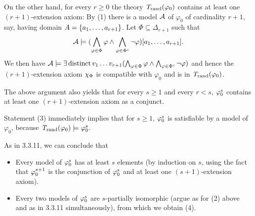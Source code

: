 \begin{enumerate}[1.]
On the other hand, for every $r \geq 0$ the theory $\mathit{T}_{\mathrm{rand}}(\varphi_0)$ contains at least one $(r + 1)$-extension axiom: By (1) there is a model $\mathcal{A}$ of $\varphi_0$ of cardinality $r + 1$, say, having domain $A = {\{a_1, \ldots, a_{r + 1}\}}$. Let $\Phi \subseteq \Delta_{r + 1}$ such that
\[
\mathcal{A} \models (\bigwedge_{\varphi \in \Phi} \varphi \land \bigwedge_{\varphi \in \Phi^\mathit{c}} \neg\varphi) [a_1, \ldots, a_{r + 1}].
\]
We then have $\mathcal{A} \models \exists \mathop{\mathrm{distinct}} v_1 \ldots v_{r + 1} (\bigwedge_{\varphi \in \Phi} \varphi \land \bigwedge_{\varphi \in \Phi^\mathit{c}} \neg\varphi)$ and hence the $(r + 1)$-extension axiom $\extaxm[\Phi]$ is compatible with $\varphi_0$ and is in $\mathit{T}_{\mathrm{rand}}(\varphi_0)$.

The above argument also yields that for every $s \geq 1$ and every $r < s$, $\conjextaxm[\varphi_0]{s}$ contains at least one $(r + 1)$-extension axiom as a conjunct.

Statement (3) immediately implies that for $s \geq 1$, $\conjextaxm[\varphi_0]{s}$ is satisfiable by a model of $\varphi_0$, because $\randstrtheory(\varphi_0) \consq \conjextaxm[\varphi_0]{s}$.

As in 3.3.11, we can conclude that
\begin{itemize}
\item Every model of $\conjextaxm[\varphi_0]{s}$ has at least $s$ elements (by induction on $s$, using the fact that $\conjextaxm[\varphi_0]{s + 1}$ is the conjunction of $\conjextaxm[\varphi_0]{s}$ and at least one $(s + 1)$-extension axiom).
\item Every two models of $\conjextaxm[\varphi_0]{s}$ are $s$-partially isomorphic (argue as for (2) above and as in 3.3.11 simultaneously), from which we obtain (4).
\end{itemize}


\end{enumerate}
